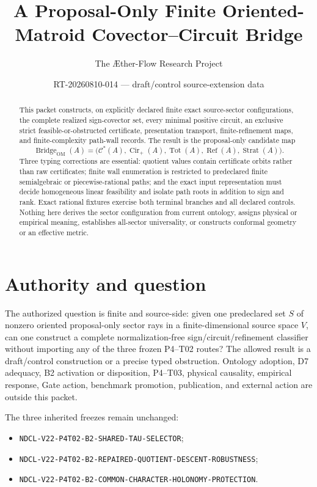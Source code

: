 \documentclass[11pt]{article}
\title{A Proposal-Only Finite Oriented-Matroid Covector--Circuit Bridge}
\author{The \AE ther-Flow Research Project}
\date{RT-20260810-014 --- draft/control source-extension data}
\newcommand{\Cstar}{\mathcal{C}^{*}}
\newcommand{\Cirp}{\operatorname{Cir}_{+}}
\newcommand{\Bridge}{\operatorname{Bridge}_{\mathrm{OM}}}
\begin{document}
\maketitle

\begin{abstract}
This packet constructs, on explicitly declared finite exact source-sector
configurations, the complete realized sign-covector set, every minimal positive
circuit, an exclusive strict feasible-or-obstructed certificate, presentation
transport, finite-refinement maps, and finite-complexity path-wall records.  The
result is the proposal-only candidate map
\[
  \Bridge(A)=\bigl(\Cstar(A),\Cirp(A),\operatorname{Tot}(A),
  \operatorname{Ref}(A),\operatorname{Strat}(A)\bigr).
\]
Three typing corrections are essential: quotient values contain certificate
orbits rather than raw certificates; finite wall enumeration is restricted to
predeclared finite semialgebraic or piecewise-rational paths; and the exact
input representation must decide homogeneous linear feasibility and isolate
path roots in addition to sign and rank.  Exact rational fixtures exercise both
terminal branches and all declared controls.  Nothing here derives the sector
configuration from current ontology, assigns physical or empirical meaning,
establishes all-sector universality, or constructs conformal geometry or an
effective metric.
\end{abstract}

\section{Authority and question}

The authorized question is finite and source-side: given one predeclared set
$S$ of nonzero oriented proposal-only sector rays in a finite-dimensional
source space $V$, can one construct a complete normalization-free
sign/circuit/refinement classifier without importing any of the three frozen
P4--T02 routes?  The allowed result is a draft/control construction or a
precise typed obstruction.  Ontology adoption, D7 adequacy, B2 activation or
disposition, P4--T03, physical causality, empirical response, Gate action,
benchmark promotion, publication, and external action are outside this packet.

The three inherited freezes remain unchanged:
\begin{itemize}[leftmargin=*]
  \item \texttt{NDCL-V22-P4T02-B2-SHARED-TAU-SELECTOR};
  \item \texttt{NDCL-V22-P4T02-B2-REPAIRED-QUOTIENT-DESCENT-ROBUSTNESS};
  \item \texttt{NDCL-V22-P4T02-B2-COMMON-CHARACTER-HOLONOMY-PROTECTION}.
\end{itemize}
\end{document}
